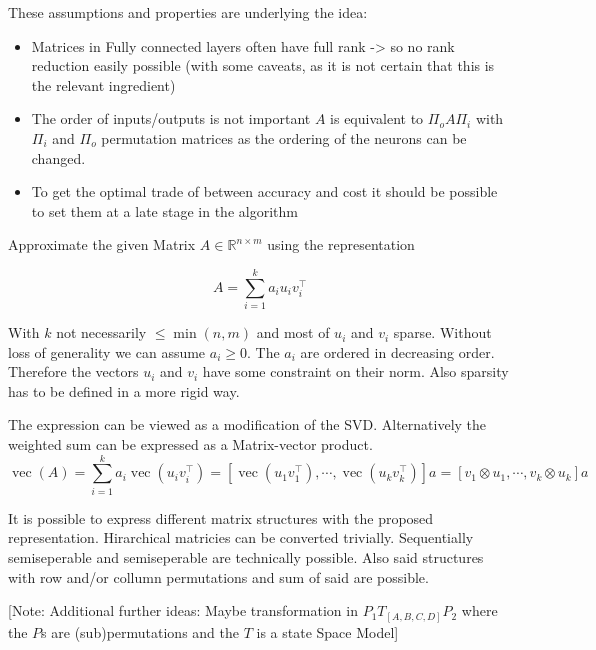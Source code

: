 \documentclass[lang=ngerman,inputenc=utf8,fontsize=10pt]{ldvarticle}
\DeclareMathOperator{\vect}{vec}
\begin{document}
These assumptions and properties are underlying the idea:
\begin{itemize}
	\item Matrices in Fully connected layers often have full rank -> so no rank reduction easily possible (with some caveats, as it is not certain that this is the relevant ingredient) \cite{martin_implicit_2018}
	\item The order of inputs/outputs is not important $A$ is equivalent to $\Pi_o A \Pi_i$ with $\Pi_i$ and $\Pi_o$ permutation matrices as the ordering of the neurons can be changed. 
	\item To get the optimal trade of between accuracy and cost it should be possible to set them at a late stage in the algorithm
\end{itemize}

Approximate the given Matrix $A \in \mathbb{R}^{n \times m}$ using the representation

\begin{equation}\label{key}
A = \sum_{i=1}^{k} a_i u_i v_i^\top 
\end{equation}

With $k$ not necessarily $\leq \min(n,m)$ and most of $u_i$ and $v_i$ sparse. Without loss of generality we can assume $a_i \geq 0$. The $a_i$ are ordered in decreasing order.
Therefore the vectors $u_i$ and $v_i$ have some constraint on their norm. 
Also sparsity has to be defined in a more rigid way.

The expression can be viewed as a modification of the SVD.
Alternatively the weighted sum can be expressed as a Matrix-vector product.
\begin{equation}\label{eq:vec}
\vect(A) = \sum_{i=1}^{k} a_i\vect(u_i v_i^\top) = \left[\vect(u_1 v_1^\top), \cdots, \vect(u_k v_k^\top)\right] a = \left[v_1 \otimes u_1, \cdots, v_k\otimes u_k\right] a
\end{equation}

It is possible to express different matrix structures with the proposed representation.
Hirarchical matricies can be converted trivially. Sequentially semiseperable and semiseperable are technically possible.
Also said structures with row and/or collumn permutations and sum of said are possible.

[Note: Additional further ideas: Maybe transformation in $P_1 T_{[A,B,C,D]} P_2$ where the $P$s are (sub)permutations and the $T$ is a state Space Model]
\end{document}
